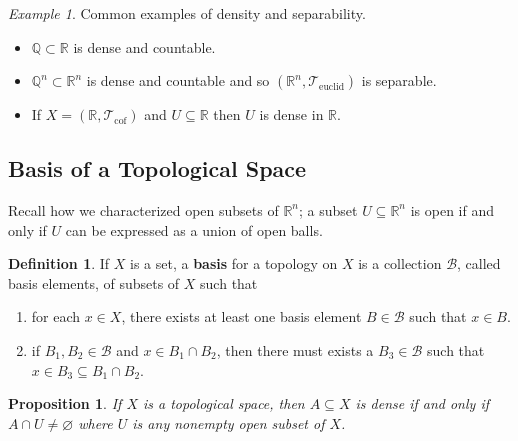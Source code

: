 \documentclass[ 12pt ]{article}
\theoremstyle{plain}
\theoremstyle{plain}
\newtheorem{proposition}[theorem]{Proposition}
\theoremstyle{definition}
\newtheorem{definition}[theorem]{Definition}
\theoremstyle{remark}
\newtheorem{example}[theorem]{Example}
\begin{document}
\begin{example}
	Common examples of density and separability.
	\begin{itemize}
		\item $\mathbb{Q} \subset \mathbb{R}$ is dense and countable.
		\item $\mathbb{Q}^n \subset \mathbb{R}^n$ is dense and countable and so $(\mathbb{R}^n, \mathcal{T}_{\mathrm{euclid}})$ is separable.
		\item If $X = (\mathbb{R}, \mathcal{T}_{\mathrm{cof}})$ and $U \subseteq \mathbb{R}$ then $U$ is dense in $\mathbb{R}$.
	\end{itemize}
\end{example}

\subsection*{Basis of a Topological Space}

Recall how we characterized open subsets of $\mathbb{R}^n$; a subset $U \subseteq \mathbb{R}^n$ is open if and only if $U$ can be expressed as a union of open balls.

\begin{definition}
	If $X$ is a set, a \textbf{basis} for a topology on $X$ is a collection $\mathcal{B}$, called basis elements, of subsets of $X$ such that
	\begin{enumerate}
		\item for each $x \in X$, there exists at least one basis element $B \in \mathcal{B}$ such that $x \in B$.
		\item if $B_1, B_2 \in \mathcal{B}$ and $x \in B_1 \cap B_2$, then there must exists a $B_3 \in \mathcal{B}$ such that $x \in B_3 \subseteq B_1 \cap B_2$.
	\end{enumerate}
\end{definition}

\begin{proposition}
	If $X$ is a topological space, then $A \subseteq X$ is dense if and only if $A \cap U \neq \varnothing$ where $U$ is any nonempty open subset of $X$.
\end{proposition}
\end{document}
